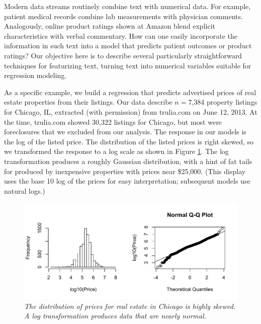 \documentclass[12pt]{article}
\begin{document}
 
 \clearpage


 Modern data streams routinely combine text with numerical data.  For example,
 patient medical records combine lab measurements with physician comments.
  Analogously, online product ratings shown at Amazon blend explicit
 characteristics with verbal commentary.  How can one easily incorporate the
 information in such text into a model that predicts patient outcomes or product
 ratings?  Our objective here is to describe several particularly
 straightforward techniques for featurizing text, turning text into numerical
 variables suitable for regression modeling.
 
 
 As a specific example, we build a regression that predicts advertised prices
 of real estate properties from their listings.  Our data describe $n=$7,384
 property listings for Chicago, IL, extracted (with permission) from trulia.com
 on June 12, 2013.  At the time, trulia.com showed 30,322 listings for Chicago,
 but most were foreclosures that we excluded from our analysis.  The response in
 our models is the log of the listed price.  The distribution of the listed
 prices is right skewed, so we transformed the response to a log scale as shown
 in Figure \ref{fig:prices}.  The log transformation produces a roughly Gaussian
 distribution, with a hint of fat tails for produced by inexpensive properties
 with prices near \$25,000.  (This display uses the base 10 log of the prices
 for easy interpretation; subsequent models use natural logs.)
 
 
 \begin{figure}
 \caption{ \label{fig:prices} { \sl The distribution of prices for real estate
 in Chicago is highly skewed.  A log transformation produces data that are
 nearly normal.}  }
 \centerline{
 \vspace{0.1in}
 \includegraphics[width=5in]{figures/prices} }
 \vspace{0.2in}
 \end{figure}
\end{document}
